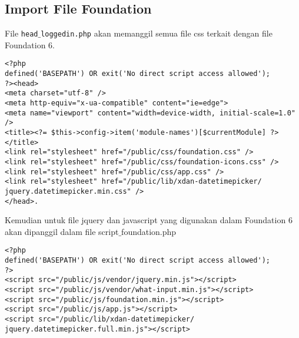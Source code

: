 \subsection{Import File Foundation}
File \texttt{head$\_$loggedin.php} akan memanggil semua file css terkait dengan file Foundation 6.
\begin{lstlisting}[frame=single, basicstyle=\small]
<?php
defined('BASEPATH') OR exit('No direct script access allowed');
?><head>
<meta charset="utf-8" />
<meta http-equiv="x-ua-compatible" content="ie=edge">
<meta name="viewport" content="width=device-width, initial-scale=1.0" />
<title><?= $this->config->item('module-names')[$currentModule] ?></title>
<link rel="stylesheet" href="/public/css/foundation.css" />
<link rel="stylesheet" href="/public/css/foundation-icons.css" />
<link rel="stylesheet" href="/public/css/app.css" />
<link rel="stylesheet" href="/public/lib/xdan-datetimepicker/
jquery.datetimepicker.min.css" />
</head>.
\end{lstlisting}
Kemudian untuk file jquery dan javascript yang digunakan dalam Foundation 6 akan dipanggil dalam file script$\_$foundation.php
\begin{lstlisting}[frame=single, basicstyle=\small]
<?php
defined('BASEPATH') OR exit('No direct script access allowed');
?>
<script src="/public/js/vendor/jquery.min.js"></script>
<script src="/public/js/vendor/what-input.min.js"></script>
<script src="/public/js/foundation.min.js"></script>
<script src="/public/js/app.js"></script>
<script src="/public/lib/xdan-datetimepicker/
jquery.datetimepicker.full.min.js"></script>
\end{lstlisting}

